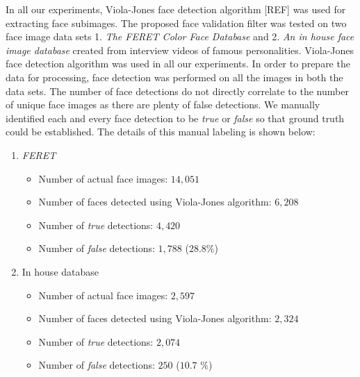 \documentclass[times, 10pt,twocolumn]{article}
\begin{document}
\label{Experiments} In all our experiments,
Viola-Jones face detection algorithm [REF] was used for extracting
face subimages. The proposed face validation filter was tested on
two face image data sets 1. {\it The FERET Color Face Database} and
2. {\it An in house face image database} created from interview
videos of famous personalities. Viola-Jones face detection algorithm
\cite{viola_robust_2004} was used in all our experiments. In order
to prepare the data for processing, face detection was performed on
all the images in both the data sets. The number of face detections
do not directly correlate to the number of unique face images as
there are plenty of false detections. We manually identified each
and every face detection to be {\it true} or {\it false} so that
ground truth could be established. The details of this manual
labeling is shown below:
\begin{enumerate}
\item {\em FERET}
\begin{itemize}
\item Number of actual face images: $14,051$
\item Number of faces detected using Viola-Jones algorithm: $6,208$
\item Number of {\it true} detections: $4,420$
\item Number of {\it false} detections: $1,788$ ($28.8$\%)
\end{itemize}
\item {In house database}
\begin{itemize}
\item Number of actual face images: $2,597$
\item Number of faces detected using Viola-Jones algorithm: $2,324$
\item Number of {\it true} detections: $2,074$
\item Number of {\it false} detections: $250$ ($10.7$ \%)
\end{itemize}
\end{enumerate}
\end{document}
